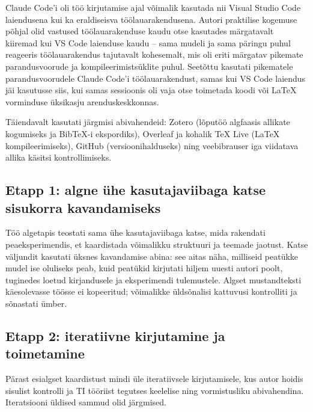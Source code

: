 Claude Code'i oli töö kirjutamise ajal võimalik kasutada nii Visual Studio Code laiendusena kui ka eraldiseisva töölaua\-rakendusena. Autori praktilise kogemuse põhjal olid vastused töölaua\-rakenduse kaudu otse kasutades märgatavalt kiiremad kui VS Code laienduse kaudu -- sama mudeli ja sama päringu puhul reageeris töölauarakendus tajutavalt kohesemalt, mis oli eriti märgatav pikemate parandusvoorude ja kompileerimistsüklite puhul. Seetõttu kasutati pikematele parandusvoorudele Claude Code'i töölauarakendust, samas kui VS Code laiendus jäi kasutusse siis, kui samas sessioonis oli vaja otse toimetada koodi või \LaTeX{} vorminduse üksikasju arenduskeskkonnas.

Täiendavalt kasutati järgmisi abivahendeid: Zotero (lõputöö algfaasis allikate kogumiseks ja BibTeX-i ekspordiks), Overleaf ja kohalik TeX Live (\LaTeX{} kompileerimiseks), GitHub (versioonihalduseks) ning veebibrauser iga viidatava allika käsitsi kontrollimiseks.

\subsection{Etapp 1: algne ühe kasutajaviibaga katse sisukorra kavandamiseks} \label{subsec:etapp1}

Töö algetapis teostati sama ühe kasutajaviibaga katse, mida rakendati peaeksperimendis, et kaardistada võimalikku struktuuri ja teemade jaotust. Katse väljundit kasutati üksnes kavandamise abina: see aitas näha, milliseid peatükke mudel ise oluliseks peab, kuid peatükid kirjutati hiljem uuesti autori poolt, tuginedes loetud kirjandusele ja eksperimendi tulemustele. Algset mustandteksti käesolevasse töösse ei kopeeritud; võimalikke üldsõnalisi kattuvusi kontrolliti ja sõnastati ümber.

\subsection{Etapp 2: iteratiivne kirjutamine ja toimetamine} \label{subsec:etapp2}

Pärast esialgset kaardistust mindi üle iteratiivsele kirjutamisele, kus autor hoidis sisulist kontrolli ja TI tööriist tegutses keelelise ning vormistusliku abivahendina. Iteratsiooni üldised sammud olid järgmised.


